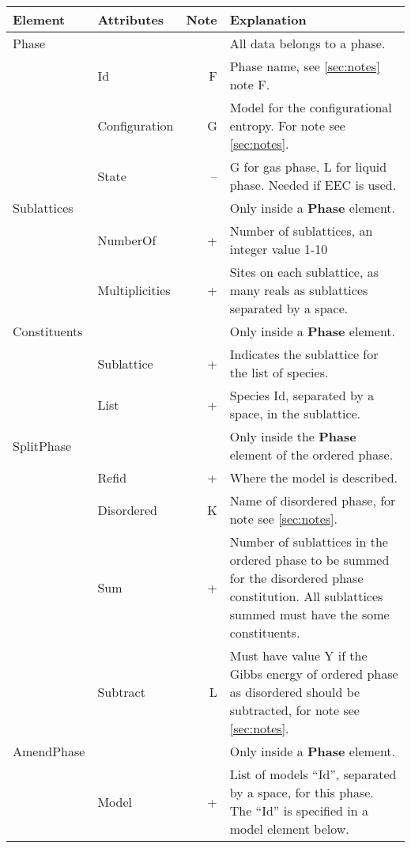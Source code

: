 \documentclass{article}
\begin{document}
\begin{tabular}{|p{} p{} r p{}|}\hline
  Element & Attributes & Note & Explanation\\\hline

  Phase & && All data belongs to a phase.\\
       & Id & F & Phase name, see \ref{sec:notes} note F. \\
       & Configuration & G & Model for the configurational entropy.  For note see \ref{sec:notes}.\\
       & State & -- & G for gas phase, L for liquid phase.  Needed if EEC is used.\\\hline

  Sublattices & && Only inside a {\bf Phase} element.\\
        & NumberOf & + & Number of sublattices, an integer value 1-10 \\
        & Multiplicities & + & Sites on each sublattice, as many reals as sublattices separated by a space.\\\hline

  Constituents & && Only inside a {\bf Phase} element.\\
        & Sublattice & + & Indicates the sublattice for the list of species.\\
        & List & + & Species Id, separated by a space, in the sublattice.\\\hline

  SplitPhase & && Only inside the {\bf Phase} element of the ordered phase.\\
      & Refid & + & Where the model is described.\\
      & Disordered & K & Name of disordered phase, for note see \ref{sec:notes}.\\
      & Sum & + & Number of sublattices in the ordered phase to be summed for the disordered phase constitution.  All sublattices summed must have the some constituents.\\
      & Subtract & L & Must have value Y if the Gibbs energy of ordered phase as disordered should be subtracted, for note see \ref{sec:notes}.\\\hline

  AmendPhase & && Only inside a {\bf Phase} element.\\
  & Model & + & List of models ``Id'', separated by a space, for this phase.  The ``Id'' is specified in a model element below.\\\hline
\end{tabular}
\end{document}
